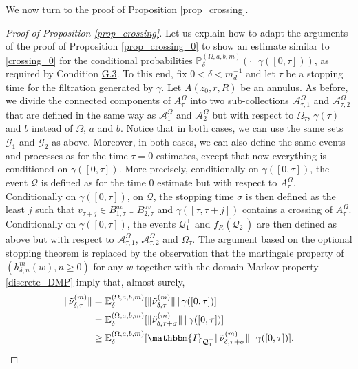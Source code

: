 \documentclass{article}
\newcommand{\PP}{{\mathbb{P}}}
\newcommand{\EE}{{\mathbb{E}}}
\theoremstyle{definition}
\theoremstyle{remark}
\theoremstyle{remark}
\begin{document}
We now turn to the proof of Proposition \ref{prop_crossing}.

\begin{proof}[Proof of Proposition \ref{prop_crossing}]
Let us explain how to adapt the arguments of the proof of Proposition \ref{prop_crossing_0} to show an estimate similar to \eqref{crossing_0} for the conditional probabilities $\PP_{\delta}^{(\Omega,a,b,m)}(\cdot \, \vert \, \gamma([0,\tau]))$, as required by Condition \hyperref[condG3]{G.3}. To this end, fix $0<\delta<\overline{m}_d^{-1}$ and let $\tau$ be a stopping time for the filtration generated by $\gamma$. Let $A(z_0,r,R)$ be an annulus. As before,  we divide the connected components of $A_{\tau}^{\Omega}$ into two sub-collections $\mathcal{A}_{\tau,1}^{\Omega}$ and $\mathcal{A}_{\tau,2}^{\Omega}$ that are defined in the same way as $\mathcal{A}_{1}^{\Omega}$ and $\mathcal{A}_{2}^{\Omega}$ but with respect to $\Omega_{\tau}$, $\gamma(\tau)$ and $b$ instead of $\Omega$, $a$ and $b$. Notice that in both cases, we can use the same sets $\mathcal{G}_1$ and $\mathcal{G}_2$ as above. Moreover, in both cases, we can also define the same events and processes as for the time $\tau=0$ estimates, except that now everything is conditioned on $\gamma([0,\tau])$. More precisely, conditionally on $\gamma([0,\tau])$, the event $\mathcal{Q}$ is defined as for the time $0$ estimate but with respect to $A^{\Omega}_{\tau}$. Conditionally on $\gamma([0,\tau])$, on $\mathcal{Q}$, the stopping time $\sigma$ is then defined as the least $j$ such that  $v_{\tau+j} \in B_{1,\tau}^{av} \cup B_{2,\tau}^{av}$ and $\gamma([\tau,\tau+j])$ contains a crossing of $A_{\tau}^{\Omega}$. Conditionally on $\gamma([0,\tau])$, the events $\mathcal{Q}_{1}^{\pm}$ and $f_{R}^{-}(\mathcal{Q}_{2}^{\pm})$ are then defined as above but with respect to $\mathcal{A}_{\tau,1}^{\Omega}$, $\mathcal{A}_{\tau, 2}^{\Omega}$ and $\Omega_{\tau}$. The argument based on the optional stopping theorem is replaced by the observation that the martingale property of $(h_{\delta, n}^m(w), n \geq 0)$ for any $w$ together with the domain Markov property \eqref{discrete_DMP} imply that, almost surely,
\begin{align*}
    \| \tilde \nu_{\delta,\tau}^{(m)} \| &= \EE_{\delta}^{(\Omega,a,b,m)}[\| \tilde \nu_{\delta,\tau}^{(m)} \| \, \vert \,\gamma([0,\tau])] \\
    &= \EE_{\delta}^{(\Omega,a,b,m)}[\| \tilde \nu_{\delta,\tau + \sigma}^{(m)} \| \, \vert \, \gamma([0,\tau])] \\
    &\geq \EE_{\delta}^{(\Omega,a,b,m)}[ \mathbbm{I}_{\mathcal{Q}_{1}^{-}} \| \tilde \nu_{\delta,\tau + \sigma}^{(m)} \| \, \vert \, \gamma([0,\tau])].

\end{align*}
\end{proof}
\end{document}
